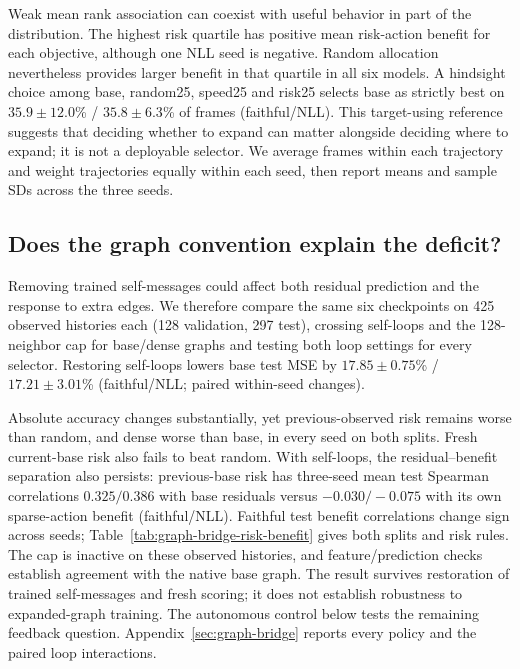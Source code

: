 Weak mean rank association can coexist with useful behavior in part of the distribution. The highest risk quartile has positive mean risk-action benefit for each objective, although one NLL seed is negative. Random allocation nevertheless provides larger benefit in that quartile in all six models. A hindsight choice among base, random25, speed25 and risk25 selects base as strictly best on $35.9\pm12.0$\% / $35.8\pm6.3$\% of frames (faithful/NLL). This target-using reference suggests that deciding whether to expand can matter alongside deciding where to expand; it is not a deployable selector. We average frames within each trajectory and weight trajectories equally within each seed, then report means and sample SDs across the three seeds.

\subsection{Does the graph convention explain the deficit?}
Removing trained self-messages could affect both residual prediction and the response to extra edges. We therefore compare the same six checkpoints on 425 observed histories each (128 validation, 297 test), crossing self-loops and the 128-neighbor cap for base/dense graphs and testing both loop settings for every selector. Restoring self-loops lowers base test MSE by $17.85\pm0.75$\% / $17.21\pm3.01$\% (faithful/NLL; paired within-seed changes).

Absolute accuracy changes substantially, yet previous-observed risk remains worse than random, and dense worse than base, in every seed on both splits. Fresh current-base risk also fails to beat random. With self-loops, the residual--benefit separation also persists: previous-base risk has three-seed mean test Spearman correlations $0.325/0.386$ with base residuals versus $-0.030/-0.075$ with its own sparse-action benefit (faithful/NLL). Faithful test benefit correlations change sign across seeds; Table~\ref{tab:graph-bridge-risk-benefit} gives both splits and risk rules. The cap is inactive on these observed histories, and feature/prediction checks establish agreement with the native base graph. The result survives restoration of trained self-messages and fresh scoring; it does not establish robustness to expanded-graph training. The autonomous control below tests the remaining feedback question. Appendix~\ref{sec:graph-bridge} reports every policy and the paired loop interactions.


